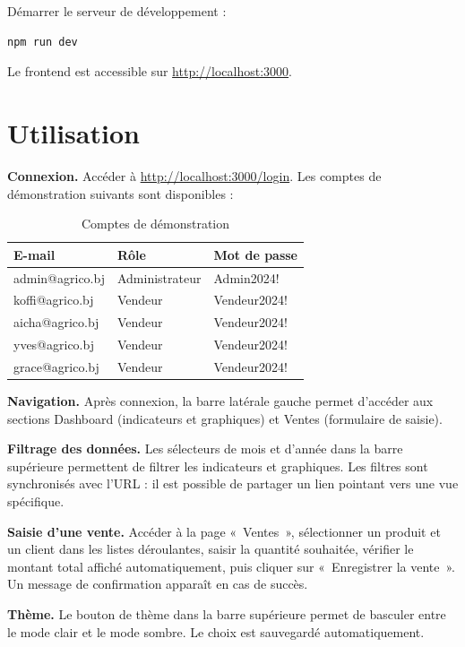 \documentclass[11pt,a4paper]{report}
\begin{document}
Démarrer le serveur de développement :
\begin{lstlisting}[language=bash,numbers=none]
npm run dev
\end{lstlisting}

Le frontend est accessible sur \url{http://localhost:3000}.

\section*{Utilisation}
\textbf{Connexion.} Accéder à \url{http://localhost:3000/login}. Les comptes de
démonstration suivants sont disponibles :

\begin{table}[H]
\centering
\caption{Comptes de démonstration}
\label{tab:comptes}
\renewcommand{\arraystretch}{1.25}
\begin{tabular}{@{}l l l@{}}
\toprule
\textbf{E-mail} & \textbf{Rôle} & \textbf{Mot de passe}\\
\midrule
admin@agrico.bj & Administrateur & Admin2024!\\
koffi@agrico.bj & Vendeur        & Vendeur2024!\\
aicha@agrico.bj & Vendeur        & Vendeur2024!\\
yves@agrico.bj  & Vendeur        & Vendeur2024!\\
grace@agrico.bj & Vendeur        & Vendeur2024!\\
\bottomrule
\end{tabular}
\end{table}

\noindent\textbf{Navigation.} Après connexion, la barre latérale gauche permet
d'accéder aux sections Dashboard (indicateurs et graphiques) et Ventes
(formulaire de saisie).

\noindent\textbf{Filtrage des données.} Les sélecteurs de mois et d'année dans la
barre supérieure permettent de filtrer les indicateurs et graphiques. Les filtres
sont synchronisés avec l'URL : il est possible de partager un lien pointant vers
une vue spécifique.

\noindent\textbf{Saisie d'une vente.} Accéder à la page «~Ventes~», sélectionner
un produit et un client dans les listes déroulantes, saisir la quantité
souhaitée, vérifier le montant total affiché automatiquement, puis cliquer sur
«~Enregistrer la vente~». Un message de confirmation apparaît en cas de succès.

\noindent\textbf{Thème.} Le bouton de thème dans la barre supérieure permet de
basculer entre le mode clair et le mode sombre. Le choix est sauvegardé
automatiquement.
\end{document}
